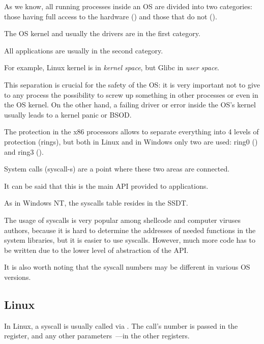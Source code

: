 
\label{syscalls}

As we know, all running processes inside an \ac{OS} are divided into two categories:
those having full access to the hardware () 
and those that do not ().

The \ac{OS} kernel and usually the drivers are in the first category.

All applications are usually in the second category.

For example, Linux kernel is in \emph{kernel space}, but Glibc in \emph{user space}.

This separation is crucial for the safety of the \ac{OS}: it is very important not to give to any process the possibility to screw up
something in other processes or even in the \ac{OS} kernel.
On the other hand, a failing driver or error inside the \ac{OS}'s kernel usually leads to a kernel panic or \ac{BSOD}.

The protection in the x86 processors allows to separate everything into 4 levels of protection (rings), but both in Linux
and in Windows only two are used: ring0 () and ring3 ().

System calls (syscall-s)
are a point where these two areas are connected.

It can be said that this is the main \ac{API} provided to applications.

As in \gls{Windows NT}, the syscalls table resides in the \ac{SSDT}.


The usage of syscalls is very popular among shellcode and computer viruses authors, 
because it is hard to determine the addresses of
needed functions in the system libraries, but it is easier to use syscalls. However, much more code has to be
written due to the lower level of abstraction of the \ac{API}.

It is also worth noting that the syscall numbers may be different in various OS versions.

\subsection{Linux}
\label{linux_syscall}

In Linux, a syscall is usually called via .
The call's number is passed in the \EAX register, and any other parameters~---in the other registers.

